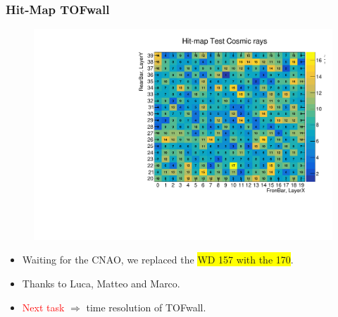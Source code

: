 \begin{frame} [fragile]
    \small
        \frametitle{Hit-Map TOFwall}
                \begin{figure}
                 \centering
                    \includegraphics[scale=0.28]{figures/hit_map_number.pdf}
                \end{figure}
            
            
				\begin{itemize}
                    \item Waiting for the CNAO, we replaced the \colorbox{yellow}{WD 157 with the 170}.
                    \item Thanks to Luca, Matteo and Marco.
                    \item \textcolor{red}{Next task} $\Longrightarrow$ time resolution of TOFwall.
                \end{itemize}    
    \end{frame}
